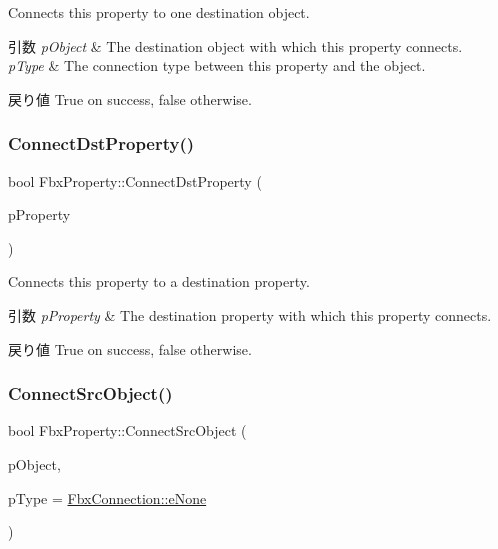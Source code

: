 Connects this property to one destination object. 
\begin{DoxyParams}{引数}
{\em p\+Object} & The destination object with which this property connects. \\
\hline
{\em p\+Type} & The connection type between this property and the object. \\
\hline
\end{DoxyParams}
\begin{DoxyReturn}{戻り値}
{\ttfamily True} on success, {\ttfamily false} otherwise. 
\end{DoxyReturn}
\mbox{\label{class_fbx_property_a1da4b660e1375970a8fa1dfb09074e3e}} 
\subsubsection{\texorpdfstring{Connect\+Dst\+Property()}{ConnectDstProperty()}}
{\footnotesize\ttfamily bool Fbx\+Property\+::\+Connect\+Dst\+Property (\begin{DoxyParamCaption}\item[{const \hyperlink{class_fbx_property}{Fbx\+Property} \&}]{p\+Property }\end{DoxyParamCaption})}

Connects this property to a destination property. 
\begin{DoxyParams}{引数}
{\em p\+Property} & The destination property with which this property connects. \\
\hline
\end{DoxyParams}
\begin{DoxyReturn}{戻り値}
{\ttfamily True} on success, {\ttfamily false} otherwise. 
\end{DoxyReturn}
\mbox{\label{class_fbx_property_ad6169eb703985c8a77f294442a03703d}} 
\subsubsection{\texorpdfstring{Connect\+Src\+Object()}{ConnectSrcObject()}}
{\footnotesize\ttfamily bool Fbx\+Property\+::\+Connect\+Src\+Object (\begin{DoxyParamCaption}\item[{\hyperlink{class_fbx_object}{Fbx\+Object} $\ast$}]{p\+Object,  }\item[{\hyperlink{class_fbx_connection_a3df448a5db356652ab99fd2be2553749}{Fbx\+Connection\+::\+E\+Type}}]{p\+Type = {\ttfamily \hyperlink{class_fbx_connection_a3df448a5db356652ab99fd2be2553749a47aa04870c3c0769263e3972e67e9ebe}{Fbx\+Connection\+::e\+None}} }\end{DoxyParamCaption})}

